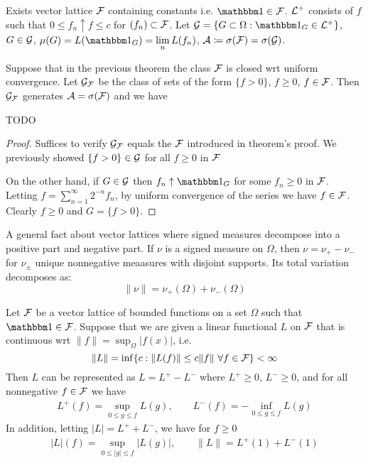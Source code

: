 
Exists vector lattice $\mathcal{F}$ containing constants i.e. $\ind \in \cF$.  $\mathcal{L}^+$
consists of $f$ such that $0 \leq f_n \uparrow f \leq c$ for $(f_n) \subset
\mathcal{F}$. Let $\cG = \{G \subset \Omega : \ind_G \in \cL^+ \}$, $G \in \mathcal{G}$,
$\mu(G) = L(\ind_G) = \lim_n L(f_n)$, $\mathcal{A} \coloneqq \sigma(\mathcal{F}) = \sigma(\mathcal{G})$.

\begin{corollary}
  Suppose that in the previous theorem
  the class $\mathcal{F}$ is closed wrt uniform convergence.
  Let $\mathcal{G}_{\mathcal{F}}$ be the class of sets of the form $\{f > 0\}$,
  $f \geq 0$, $f \in \mathcal{F}$. Then $\mathcal{G}_{\mathcal{F}}$ generates
  $\mathcal{A} = \sigma(\mathcal{F})$ and we have

  TODO
\end{corollary}

\begin{proof}
  Suffices to verify $\mathcal{G}_{\mathcal{F}}$ equals the $\mathcal{F}$ introduced in theorem's proof.
  We previously showed $\{f > 0\} \in \mathcal{G}$ for all $f \geq 0$ in $\mathcal{F}$

  On the other hand, if $G \in \mathcal{G}$ then $f_n \uparrow \ind_G$
  for some $f_n \geq 0$ in $\mathcal{F}$. Letting $f = \sum_{n=1}^\infty 2^{-n} f_n$,
  by uniform convergence of the series we have $f \in \mathcal{F}$.
  Clearly $f \geq 0$ and $G = \{f > 0\}$.
\end{proof}

A general fact about vector lattices where signed measures decompose into
a positive part and negative part. If $\nu$ is a signed measure on $\Omega$,
then $\nu = \nu_+ - \nu_-$ for $\nu_{\pm}$ unique nonnegative meaasures with
disjoint supports. Its total variation decomposes as:
\[
  \|\nu\| = \nu_+(\Omega) + \nu_-(\Omega)
\]


\begin{theorem}
  Let $\mathcal{F}$ be a vector lattice of bounded functions on a set $\Omega$
  such that $\ind \in \cF$.
  Suppose that we are given a linear functional $L$ on $\mathcal{F}$ that is continuous
  wrt $\|f\| = \sup_{\Omega} \lvert f(x) \rvert$, i.e.
  \[
    \|L\| = \inf \{ c : \|L(f)\| \leq c \|f\|~\forall f \in \mathcal{F} \} < \infty
  \]
  Then $L$ can be represented as $L = L^+ - L^-$ where
  $L^+ \geq 0$, $L^- \geq 0$, and for all nonnegative $f \in \mathcal{F}$ we have
  \begin{align*}
    L^+(f) = \sup_{0 \leq g \leq f} L(g),\qquad
    L^-(f) = -\inf_{0 \leq g \leq f} L(g)
  \end{align*}
  In addition, letting $\lvert L \rvert = L^+ + L^-$, we have for $f \geq 0$
  \begin{align*}
    \lvert L \rvert(f) = \sup_{0 \leq \lvert g \rvert \leq f} \lvert L (g) \rvert,
    \qquad \|L\| = L^+(1) + L^-(1)
  \end{align*}
\end{theorem}

